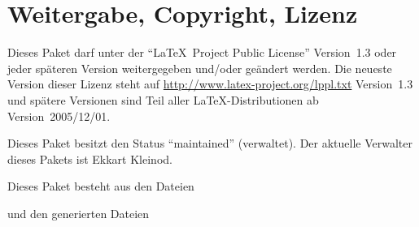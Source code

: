 \section{Weitergabe, Copyright, Lizenz}



Dieses Paket darf unter der "`\LaTeX\ Project Public License"' Version~1.3 oder jeder späteren Version weitergegeben und/oder geändert werden.
Die neueste Version dieser Lizenz steht auf \url{http://www.latex-project.org/lppl.txt} Version~1.3 und spätere Versionen sind Teil aller \LaTeX-Distributionen ab Version~2005/12/01.

Dieses Paket besitzt den Status "`maintained"' (verwaltet).
Der aktuelle Verwalter dieses Pakets ist Ekkart Kleinod.

Dieses Paket besteht aus den Dateien



und den generierten Dateien




